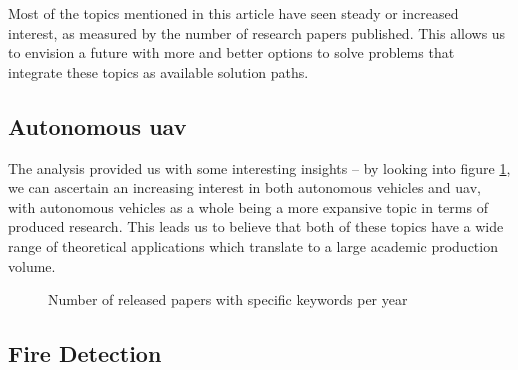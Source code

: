 \documentclass[runningheads]{llncs}
\begin{document}
Most of the topics mentioned in this article have seen steady or increased interest, as measured by the number of research papers published. This allows us to envision a future with more and better options to solve problems that integrate these topics as available solution paths.

\subsection{Autonomous \acrshort{uav}}

The analysis provided us with some interesting insights – by looking into figure \ref{fig:auav}, we can ascertain an increasing interest in both autonomous vehicles and \acrshort{uav}, with autonomous vehicles as a whole being a more expansive topic in terms of produced research. This leads us to believe that both of these topics have a wide range of theoretical applications which translate to a large academic production volume. 

\begin{figure}[htb]
\caption{Number of released papers with specific keywords per year}
\label{fig:auav}
\end{figure}

\subsection{Fire Detection}
\end{document}
